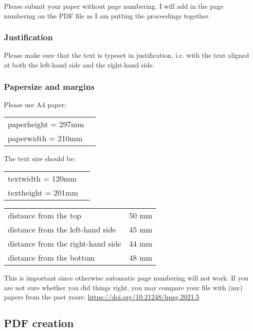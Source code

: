 \documentclass[11pt,a4paper,fleqn]{article}
\begin{document}
Please submit your paper without page numbering.  I will add in
the page numbering on the PDF file as I am putting the
proceedings together.

\subsubsection{Justification}

Please make sure that the text is typeset in justification,
i.e. with the text aligned at both the left-hand side and the right-hand side.

\subsubsection{Papersize and margins}
\label{margins}

Please use A4 paper:
\begin{table}[H]
\begin{tabular}{@{}ll}
paperheight  = 297mm\\
paperwidth   = 210mm
\end{tabular}
\end{table}
%
The text size should be:
\begin{table}[H]
\begin{tabular}{@{}ll}
textwidth  = 120mm\\
textheight = 201mm
\end{tabular}
\end{table}

\begin{table}[H]
\begin{tabular}{@{}l@{ = }l}
distance from the top & 50 mm\\
distance from the left-hand side & 45 mm\\
distance from the right-hand side & 44 mm\\
distance from the bottom & 48 mm\\
\end{tabular}
\end{table}

This is important since otherwise automatic page numbering will not work.
If you are not sure whether you did things right, you may compare your file
with (my) papers from the past years:\newline 
\url{https://doi.org/10.21248/hpsg.2021.5}

\subsection{PDF creation}
\label{sec-pdf-creation-word}
\end{document}
